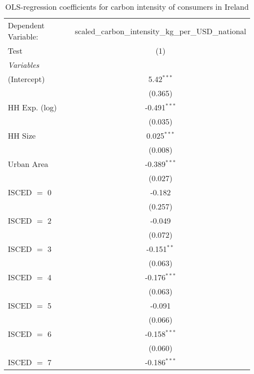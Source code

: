 
\begin{table}[htbp!]
   \centering
   \small
   \begin{adjustbox}{width = 1\textwidth, max height = 0.95\textheight, center}
      \begin{threeparttable}[b]
         \caption{\label{tab:OLS_1_IRL} OLS-regression coefficients for carbon intensity of consumers in Ireland}
         \begin{tabular}{lc}
            \tabularnewline \midrule \midrule
            Dependent Variable: & scaled\_carbon\_intensity\_kg\_per\_USD\_national\\        
            Test                & (1)\\  
            \midrule
            \emph{Variables}\\
            (Intercept)         & 5.42$^{***}$\\   
                                & (0.365)\\   
            HH Exp. (log)       & -0.491$^{***}$\\   
                                & (0.035)\\   
            HH Size             & 0.025$^{***}$\\   
                                & (0.008)\\   
            Urban Area          & -0.389$^{***}$\\   
                                & (0.027)\\   
            ISCED $=$ 0         & -0.182\\   
                                & (0.257)\\   
            ISCED $=$ 2         & -0.049\\   
                                & (0.072)\\   
            ISCED $=$ 3         & -0.151$^{**}$\\   
                                & (0.063)\\   
            ISCED $=$ 4         & -0.176$^{***}$\\   
                                & (0.063)\\   
            ISCED $=$ 5         & -0.091\\   
                                & (0.066)\\   
            ISCED $=$ 6         & -0.158$^{***}$\\   
                                & (0.060)\\   
            ISCED $=$ 7         & -0.186$^{***}$\\   

\end{tabular}
\end{threeparttable}
\end{adjustbox}
\end{table}
